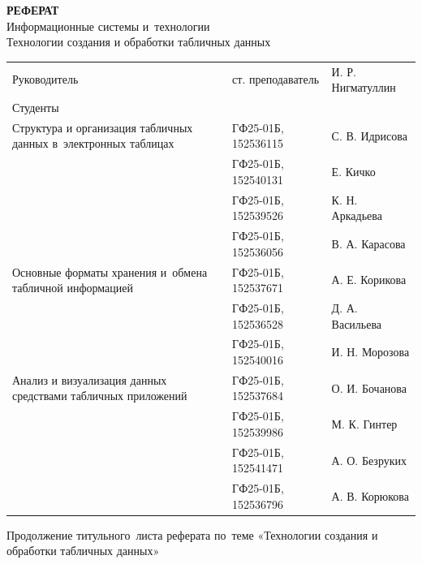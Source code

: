 \documentclass{ou}
\begin{document}
\thispagestyle{empty}
\begin{center}
\shortstack{\FGAVO}\vspace{4\baselineskip}
\textbf{РЕФЕРАТ}\\
Информационные системы и~технологии\\
Технологии создания и обработки табличных данных\vspace{2\baselineskip}\end{center}
\begin{flushleft}
\doublespacing
\begin{tabularx}{\textwidth}{@{} p{} l l @{}}
Руководитель & ст. преподаватель & И. Р. Нигматуллин\\
Студенты     &                   &                  \\
\multirow{-2.27}{\hsize}{\singlespacing Структура и организация табличных данных в~электронных таблицах}
             & ГФ25-01Б, 152536115 & С. В. Идрисова\\
             & ГФ25-01Б, 152540131 & Е. Кичко\\
             & ГФ25-01Б, 152539526 & К. Н. Аркадьева\\
             & ГФ25-01Б, 152536056 & В. А. Карасова\\
\multirow{-2.27}{\hsize}{\singlespacing Основные форматы хранения и~обмена табличной информацией}
             & ГФ25-01Б, 152537671 & А. Е. Корикова\\
             & ГФ25-01Б, 152536528 & Д. А. Васильева\\
             & ГФ25-01Б, 152540016 & И. Н. Морозова\\
\multirow{-2.27}{\hsize}{\singlespacing Анализ и визуализация данных средствами табличных приложений}
             & ГФ25-01Б, 152537684 & О. И. Бочанова\\
             & ГФ25-01Б, 152539986 & М. К. Гинтер\\
             & ГФ25-01Б, 152541471 & А. О. Безруких\\
             & ГФ25-01Б, 152536796 & А. В. Корюкова\\
\end{tabularx}
\end{flushleft}
\vspace*{\fill}
\begin{center}
\city
\end{center}
\newpage
\thispagestyle{empty}
Продолжение титульного~листа реферата по~теме «Технологии создания и обработки табличных данных»
\end{document}
